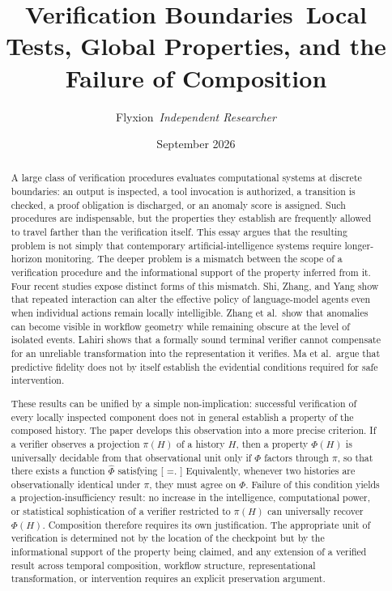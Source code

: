 \documentclass[11pt]{article}
\title{Verification Boundaries\
\large Local Tests, Global Properties, and the Failure of Composition}
\author{Flyxion\
\textit{Independent Researcher}}
\date{September 2026}
\begin{document}
\maketitle

\begin{abstract} A large class of verification procedures evaluates computational systems at discrete boundaries: an output is inspected, a tool invocation is authorized, a transition is checked, a proof obligation is discharged, or an anomaly score is assigned. Such procedures are indispensable, but the properties they establish are frequently allowed to travel farther than the verification itself. This essay argues that the resulting problem is not simply that contemporary artificial-intelligence systems require longer-horizon monitoring. The deeper problem is a mismatch between the scope of a verification procedure and the informational support of the property inferred from it. Four recent studies expose distinct forms of this mismatch. Shi, Zhang, and Yang show that repeated interaction can alter the effective policy of language-model agents even when individual actions remain locally intelligible. Zhang et al.\ show that anomalies can become visible in workflow geometry while remaining obscure at the level of isolated events. Lahiri shows that a formally sound terminal verifier cannot compensate for an unreliable transformation into the representation it verifies. Ma et al.\ argue that predictive fidelity does not by itself establish the evidential conditions required for safe intervention.

These results can be unified by a simple non-implication: successful verification of every locally inspected component does not in general establish a property of the composed history. The paper develops this observation into a more precise criterion. If a verifier observes a projection $\pi(H)$ of a history $H$, then a property $\Phi(H)$ is universally decidable from that observational unit only if $\Phi$ factors through $\pi$, so that there exists a function $\widehat{\Phi}$ satisfying [ \Phi=\widehat{\Phi}\circ\pi. ] Equivalently, whenever two histories are observationally identical under $\pi$, they must agree on $\Phi$. Failure of this condition yields a projection-insufficiency result: no increase in the intelligence, computational power, or statistical sophistication of a verifier restricted to $\pi(H)$ can universally recover $\Phi(H)$. Composition therefore requires its own justification. The appropriate unit of verification is determined not by the location of the checkpoint but by the informational support of the property being claimed, and any extension of a verified result across temporal composition, workflow structure, representational transformation, or intervention requires an explicit preservation argument. \end{abstract}
\end{document}
